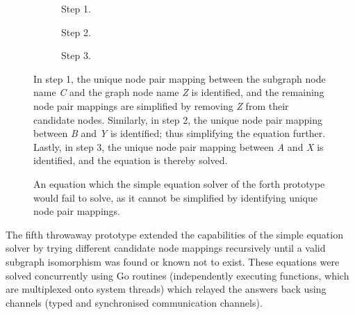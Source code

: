 \begin{figure}[htbp]
	\centering
	\begin{subfigure}[t]{0.30\textwidth}
		
		\caption{Step 1.}
	\end{subfigure}
	\enskip
	\begin{subfigure}[t]{0.23\textwidth}
		
		\caption{Step 2.}
	\end{subfigure}
	\enskip
	\begin{subfigure}[t]{0.17\textwidth}
		
		\caption{Step 3.}
	\end{subfigure}
	\caption{In step 1, the unique node pair mapping between the subgraph node name \textit{C} and the graph node name \textit{Z} is identified, and the remaining node pair mappings are simplified by removing \textit{Z} from their candidate nodes. Similarly, in step 2, the unique node pair mapping between \textit{B} and \textit{Y} is identified; thus simplifying the equation further. Lastly, in step 3, the unique node pair mapping between \textit{A} and \textit{X} is identified, and the equation is thereby solved.}
	\label{fig:equation_unique}
\end{figure}

\begin{figure}[htbp]
	\centering
	\begin{subfigure}[ht]{0.23\textwidth}
		
	\end{subfigure}
	\caption{An equation which the simple equation solver of the forth prototype would fail to solve, as it cannot be simplified by identifying unique node pair mappings.}
	\label{fig:equation_fail}
\end{figure}

The fifth throwaway prototype extended the capabilities of the simple equation solver by trying different candidate node mappings recursively until a valid subgraph isomorphism was found or known not to exist. These equations were solved concurrently using Go routines (independently executing functions, which are multiplexed onto system threads) which relayed the answers back using channels (typed and synchronised communication channels).

